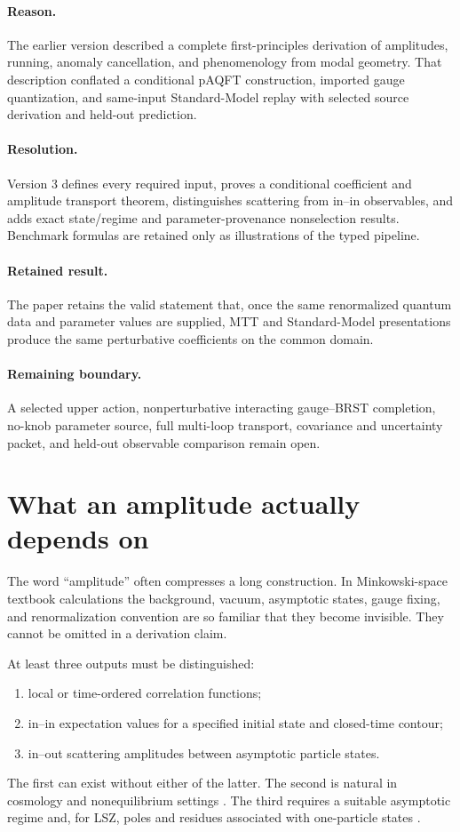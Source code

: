 \documentclass[11pt,a4paper]{article}
\numberwithin{equation}{section}
\theoremstyle{definition}
\theoremstyle{remark}
\begin{document}
\paragraph{Reason.} The earlier version described a complete
first-principles derivation of amplitudes, running, anomaly cancellation,
and phenomenology from modal geometry.  That description conflated a
conditional pAQFT construction, imported gauge quantization, and
same-input Standard-Model replay with selected source derivation and
held-out prediction.

\paragraph{Resolution.} Version 3 defines every required input, proves a
conditional coefficient and amplitude transport theorem, distinguishes
scattering from in--in observables, and adds exact state/regime and
parameter-provenance nonselection results.  Benchmark formulas are retained
only as illustrations of the typed pipeline.

\paragraph{Retained result.} The paper retains the valid statement that,
once the same renormalized quantum data and parameter values are supplied,
MTT and Standard-Model presentations produce the same perturbative
coefficients on the common domain.

\paragraph{Remaining boundary.} A selected upper action, nonperturbative
interacting gauge--BRST completion, no-knob parameter source, full
multi-loop transport, covariance and uncertainty packet, and held-out
observable comparison remain open.

\section{What an amplitude actually depends on}

The word ``amplitude'' often compresses a long construction.  In
Minkowski-space textbook calculations the background, vacuum, asymptotic
states, gauge fixing, and renormalization convention are so familiar that
they become invisible.  They cannot be omitted in a derivation claim.

At least three outputs must be distinguished:
\begin{enumerate}
\item local or time-ordered correlation functions;
\item in--in expectation values for a specified initial state and
closed-time contour;
\item in--out scattering amplitudes between asymptotic particle states.
\end{enumerate}
The first can exist without either of the latter.  The second is natural
in cosmology and nonequilibrium settings
\cite{Schwinger1961,Keldysh1965}.  The third requires a suitable
asymptotic regime and, for LSZ, poles and residues associated with
one-particle states \cite{LSZ1955}.
\end{document}
